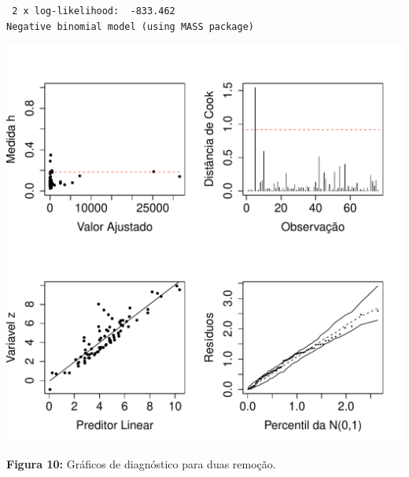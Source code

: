 \documentclass[12pt,a4paper]{article}\usepackage[]{graphicx}\usepackage[]{color}
\makeatletter
\def\maxwidth{ %
  \ifdim\Gin@nat@width>\linewidth
    \linewidth
  \else
    \Gin@nat@width
  \fi
}
\newenvironment{kframe}{%
 \def\at@end@of@kframe{}%
 \ifinner\ifhmode%
  \def\at@end@of@kframe{\end{minipage}}%
  \begin{minipage}{\columnwidth}%
 \fi\fi%
 \def\FrameCommand##1{\hskip\@totalleftmargin \hskip-\fboxsep
 \colorbox{shadecolor}{##1}\hskip-\fboxsep
     \hskip-\linewidth \hskip-\@totalleftmargin \hskip\columnwidth}%
 \MakeFramed {\advance\hsize-\width
   \@totalleftmargin\z@ \linewidth\hsize
   \@setminipage}}%
 {\par\unskip\endMakeFramed%
 \at@end@of@kframe}
\newenvironment{knitrout}{}{} %
\makeatother
\begin{document}
\begin{knitrout}
\begin{kframe}
\begin{verbatim}
 2 x log-likelihood:  -833.462 
Negative binomial model (using MASS package) 
\end{verbatim}
\end{kframe}
\includegraphics[width=\maxwidth]{figure/unnamed-chunk-24-1} 

\end{knitrout}
\textbf{Figura 10:} Gráficos de diagnóstico para duas remoção.
\end{document}
